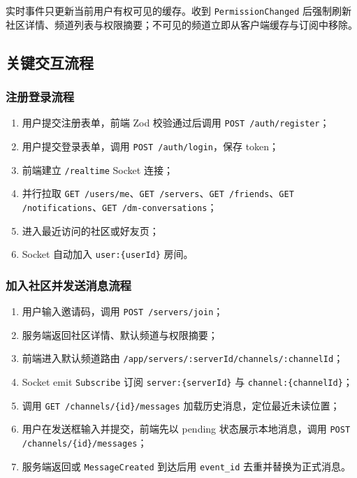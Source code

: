 实时事件只更新当前用户有权可见的缓存。收到 \texttt{PermissionChanged} 后强制刷新社区详情、频道列表与权限摘要；不可见的频道立即从客户端缓存与订阅中移除。

\subsection{关键交互流程}

\subsubsection{注册登录流程}
\begin{enumerate}
  \item 用户提交注册表单，前端 Zod 校验通过后调用 \texttt{POST /auth/register}；
  \item 用户提交登录表单，调用 \texttt{POST /auth/login}，保存 token；
  \item 前端建立 \texttt{/realtime} Socket 连接；
  \item 并行拉取 \texttt{GET /users/me}、\texttt{GET /servers}、\texttt{GET /friends}、\texttt{GET /notifications}、\texttt{GET /dm-conversations}；
  \item 进入最近访问的社区或好友页；
  \item Socket 自动加入 \texttt{user:\{userId\}} 房间。
\end{enumerate}

\subsubsection{加入社区并发送消息流程}
\begin{enumerate}
  \item 用户输入邀请码，调用 \texttt{POST /servers/join}；
  \item 服务端返回社区详情、默认频道与权限摘要；
  \item 前端进入默认频道路由 \texttt{/app/servers/:serverId/channels/:channelId}；
  \item Socket emit \texttt{Subscribe} 订阅 \texttt{server:\{serverId\}} 与 \texttt{channel:\{channelId\}}；
  \item 调用 \texttt{GET /channels/\{id\}/messages} 加载历史消息，定位最近未读位置；
  \item 用户在发送框输入并提交，前端先以 pending 状态展示本地消息，调用 \texttt{POST /channels/\{id\}/messages}；
  \item 服务端返回或 \texttt{MessageCreated} 到达后用 \texttt{event\_id} 去重并替换为正式消息。
\end{enumerate}

